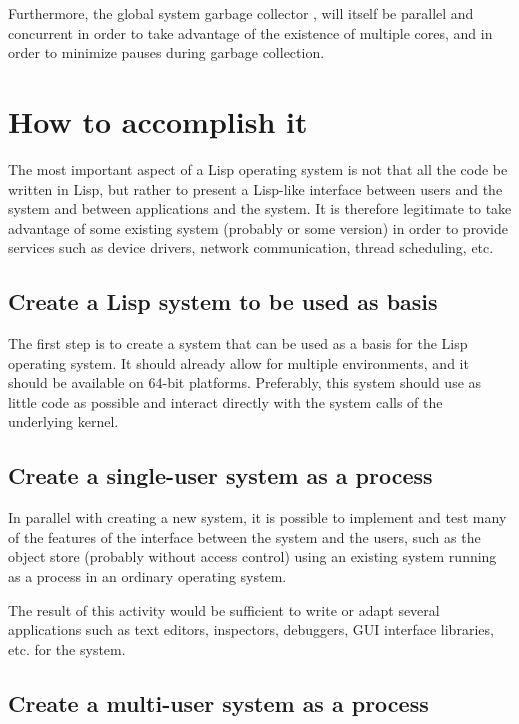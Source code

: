 Furthermore, the global system garbage collector
, will itself be parallel and
concurrent in order to take advantage of the existence of multiple
cores, and in order to minimize pauses during garbage collection.

\section{How to accomplish it}

The most important aspect of a Lisp operating system is not that all
the code be written in Lisp, but rather to present a Lisp-like
interface between users and the system and between applications and
the system.  It is therefore legitimate to take advantage of some
existing system (probably \linux{} or some \bsd{} version) in order to
provide services such as device drivers, network communication, thread
scheduling, etc.

\subsection{Create a Lisp system to be used as basis}

The first step is to create a \commonlisp{} system that can be used as a basis
for the Lisp operating system.  It should already allow for multiple
environments, and it should be available on 64-bit platforms.
Preferably, this system should use as little \clanguage{} code as
possible and interact directly with the system calls of the underlying
kernel.

\subsection{Create a single-user system as a \unix{} process}

In parallel with creating a new \commonlisp{} system, it is possible to
implement and test many of the features of the interface between the
system and the users, such as the object store (probably without
access control) using an existing \commonlisp{} system running as a process in
an ordinary operating system.  

The result of this activity would be sufficient to write or adapt
several applications such as text editors, inspectors, debuggers, GUI
interface libraries, etc. for the system.

\subsection{Create a multi-user system as a \unix{} process}

